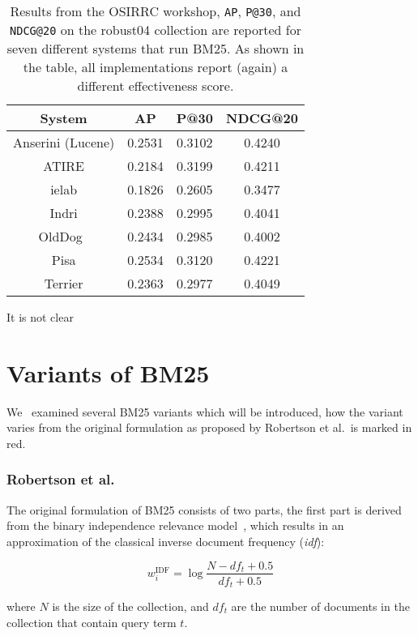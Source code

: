 \begin{table}
	\centering
	\caption{Results from the OSIRRC workshop\cite{OSIRRC}, \texttt{AP}, \texttt{P@30}, and \texttt{NDCG@20} on the robust04 collection are reported for seven different systems that run BM25. As shown in the table, all implementations report (again) a different effectiveness score.}
	\label{osirrc_results}
	\begin{tabular}{c c c c}
		\toprule
		System & AP & P@30 & NDCG@20 \\
		\midrule
		Anserini (Lucene) & 0.2531 & 0.3102 & 0.4240 \\
		ATIRE & 0.2184 & 0.3199 & 0.4211 \\
		ielab & 0.1826 & 0.2605 & 0.3477 \\
		Indri & 0.2388 & 0.2995 & 0.4041 \\
		OldDog~\cite{olddog-docker} & 0.2434 & 0.2985 & 0.4002 \\
		Pisa & 0.2534 & 0.3120 & 0.4221 \\
		Terrier & 0.2363 & 0.2977 & 0.4049 \\
		\bottomrule
	\end{tabular}
\end{table}

It is not clear 

\section{Variants of BM25}
We~\cite{Kamphuis2020BM25} examined several BM25 variants which will be introduced, how the variant varies from the original formulation as proposed by Robertson et al.~is marked in red. 

\subsubsection{Robertson et al.~\cite{bm25-robertson}} 
The original formulation of BM25 consists of two parts, the first part is derived from the binary independence relevance model~\cite{bm25-beyond}, which results in an approximation of the classical inverse document frequency (\textit{idf}):

\begin{equation} 
	w_i^{\text{IDF}} = \log\frac{N-df_t+0.5}{df_t+0.5}
\end{equation}

where $N$ is the size of the collection, and $df_t$ are the number of documents in the collection that contain query term $t$. 

